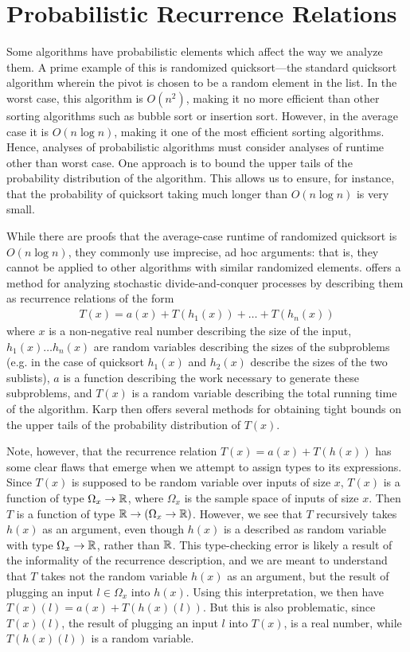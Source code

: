 \section{Probabilistic Recurrence Relations}

Some algorithms have probabilistic elements which affect the way we analyze them. A prime example of this is randomized 
quicksort---the standard quicksort algorithm wherein the pivot is chosen to be a random element in the list. In the worst case,
this algorithm is $O(n^2)$, making it no more efficient than other sorting algorithms such as bubble sort or insertion sort. 
However, in the average case it is $O(n\log n)$, making it one of the most efficient sorting algorithms. Hence, analyses of probabilistic algorithms must consider analyses of runtime other than worst case. One approach is to bound the upper
tails of the probability distribution of the algorithm. This allows us to ensure, for instance, that the probability of 
quicksort taking much longer than $O(n \log n)$ is very small. 

While there are proofs that the average-case runtime of randomized quicksort is $O(n\log n)$, they commonly use
imprecise, ad hoc arguments: that is, they cannot be applied to other algorithms with similar randomized elements. 
\cite{Karp} offers a method for analyzing stochastic divide-and-conquer processes by describing them as recurrence relations of the form
\begin{align*}
T(x) = a(x) + T(h_1(x)) + \dots + T(h_n(x))
\end{align*}
where $x$ is a non-negative real number describing the size of the input, $h_1(x) \dots h_n(x)$ are random variables 
describing the sizes of the subproblems (e.g. in the case of quicksort $h_1(x)$ and $h_2(x)$ describe the sizes of the two 
sublists), $a$ is a function describing the work necessary to generate these subproblems, and $T(x)$ is a random variable 
describing the total running time of the algorithm. Karp then offers several methods for obtaining tight bounds on the upper tails of the probability distribution of $T(x)$. 

Note, however, that the recurrence relation $T(x) = a(x) + T(h(x))$ has some clear flaws that 
emerge when we attempt to assign types to its expressions. Since $T(x)$ is supposed to be random
variable over inputs of size $x$, $T(x)$ is a function of type 
$\Omega_x \rightarrow \mathbb{R}$, where $\Omega_x$ is the sample space of inputs of size $x$. Then $T$ is a 
function of type $\mathbb{R} \rightarrow (\Omega_x \rightarrow \mathbb{R})$. However, we see that $T$ recursively takes 
$h(x)$ as an argument, even though $h(x)$ is a described as random variable with type $\Omega_x \rightarrow \mathbb{R}$, 
rather than $\mathbb{R}$. This type-checking error is likely a result of the informality of the recurrence description, 
and we are meant to understand that $T$ takes not the 
random variable $h(x)$ as an argument, but the result of plugging an input $l \in \Omega_x$ into $h(x)$. Using this 
interpretation, we then have $T(x)(l) = a(x) + T(h(x)(l))$. But this is also problematic, since $T(x)(l)$, the result 
of plugging an input $l$ into $T(x)$, is a real number, while $T(h(x)(l))$ is a random variable. 

